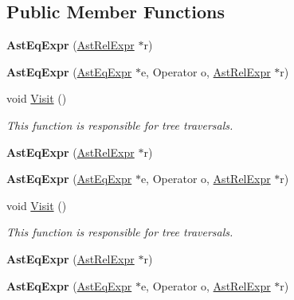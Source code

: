 \subsection*{Public Member Functions}
\begin{DoxyCompactItemize}
\item 
\hypertarget{classAstEqExpr_ae59f45e93845f531132980db8e8b8e2b}{{\bfseries Ast\-Eq\-Expr} (\hyperlink{classAstRelExpr}{Ast\-Rel\-Expr} $\ast$r)}\label{classAstEqExpr_ae59f45e93845f531132980db8e8b8e2b}

\item 
\hypertarget{classAstEqExpr_aac47a62e5410c55ac1f645a699e05ec4}{{\bfseries Ast\-Eq\-Expr} (\hyperlink{classAstEqExpr}{Ast\-Eq\-Expr} $\ast$e, Operator o, \hyperlink{classAstRelExpr}{Ast\-Rel\-Expr} $\ast$r)}\label{classAstEqExpr_aac47a62e5410c55ac1f645a699e05ec4}

\item 
void \hyperlink{classAstEqExpr_a6e0e9e88f6801eb135efef5bb5fe2851}{Visit} ()
\begin{DoxyCompactList}\small\item\em This function is responsible for tree traversals. \end{DoxyCompactList}\item 
\hypertarget{classAstEqExpr_ae59f45e93845f531132980db8e8b8e2b}{{\bfseries Ast\-Eq\-Expr} (\hyperlink{classAstRelExpr}{Ast\-Rel\-Expr} $\ast$r)}\label{classAstEqExpr_ae59f45e93845f531132980db8e8b8e2b}

\item 
\hypertarget{classAstEqExpr_aac47a62e5410c55ac1f645a699e05ec4}{{\bfseries Ast\-Eq\-Expr} (\hyperlink{classAstEqExpr}{Ast\-Eq\-Expr} $\ast$e, Operator o, \hyperlink{classAstRelExpr}{Ast\-Rel\-Expr} $\ast$r)}\label{classAstEqExpr_aac47a62e5410c55ac1f645a699e05ec4}

\item 
void \hyperlink{classAstEqExpr_a6e0e9e88f6801eb135efef5bb5fe2851}{Visit} ()
\begin{DoxyCompactList}\small\item\em This function is responsible for tree traversals. \end{DoxyCompactList}\item 
\hypertarget{classAstEqExpr_ae59f45e93845f531132980db8e8b8e2b}{{\bfseries Ast\-Eq\-Expr} (\hyperlink{classAstRelExpr}{Ast\-Rel\-Expr} $\ast$r)}\label{classAstEqExpr_ae59f45e93845f531132980db8e8b8e2b}

\item 
\hypertarget{classAstEqExpr_aac47a62e5410c55ac1f645a699e05ec4}{{\bfseries Ast\-Eq\-Expr} (\hyperlink{classAstEqExpr}{Ast\-Eq\-Expr} $\ast$e, Operator o, \hyperlink{classAstRelExpr}{Ast\-Rel\-Expr} $\ast$r)}\label{classAstEqExpr_aac47a62e5410c55ac1f645a699e05ec4}


\end{DoxyCompactItemize}
